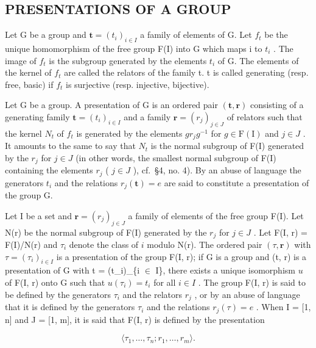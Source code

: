 \subsection{PRESENTATIONS OF A GROUP}

Let G be a group and \(\mathbf{t} = (t_{i})_{i \in I}\) a family of elements of G. Let \(f_{t}\) be the unique homomorphism of the free group F(I) into G which maps i to \(t_{i}\) . The image of \(f_{t}\) is the subgroup generated by the elements \(t_{i}\) of G. The elements of the kernel of \(f_{t}\) are called the relators of the family t. t is called generating (resp. free, basic) if \(f_{t}\) is surjective (resp. injective, bijective).

Let G be a group. A presentation of G is an ordered pair \((\mathbf{t}, \mathbf{r})\) consisting of a generating family \(\mathbf{t} = (t_{i})_{i \in I}\) and a family \(\mathbf{r} = (r_{j})_{j \in J}\) of relators such that the kernel \(N_{t}\) of \(f_{t}\) is generated by the elements \(gr_{j}g^{-1}\) for \(g \in \mathrm{F}(\mathrm{I})\) and \(j \in J\) . It amounts to the same to say that \(N_{t}\) is the normal subgroup of F(I) generated by the \(r_{j}\) for \(j \in J\) (in other words, the smallest normal subgroup of F(I) containing the elements \(r_{j}\) ( \(j \in J\) ), cf.~§4, no. 4). By an abuse of language the generators \(t_{i}\) and the relations \(r_{j}(\mathbf{t}) = e\) are said to constitute a presentation of the group G.

Let I be a set and \(\mathbf{r} = (r_j)_{j \ensuremath{\in} J}\) a family of elements of the free group F(I). Let N(r) be the normal subgroup of F(I) generated by the \(r_j\) for \(j \ensuremath{\in} J\) . Let F(I, r) = F(I)/N(r) and \(\tau_i\) denote the class of \(i\) modulo N(r). The ordered pair \((\tau, \mathbf{r})\) with \(\tau = (\tau_i)_{i \ensuremath{\in} I}\) is a presentation of the group F(I, r); if G is a group and (t, r) is a presentation of G with t = (t\_i)\_\{i \ensuremath{\in} I\}, there exists a unique isomorphism \(u\) of F(I, r) onto G such that \(u(\tau_i) = t_i\) for all \(i \ensuremath{\in} I\) . The group F(I, r) is said to be defined by the generators \(\tau_i\) and the relators \(r_j\) , or by an abuse of language that it is defined by the generators \(\tau_i\) and the relations \(r_j(\tau) = e\) . When I = {[}1, n{]} and J = {[}1, m{]}, it is said that F(I, r) is defined by the presentation

\[
\langle \tau_ {1}, \dots , \tau_ {n}; r _ {1}, \dots , r _ {m} \rangle .
\]

